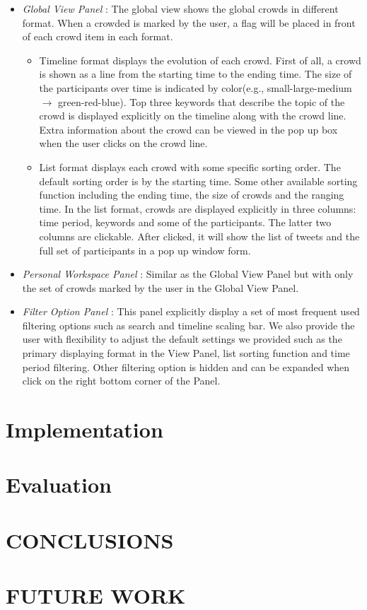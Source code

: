 \documentclass{sig-alternate}
\begin{document}
\begin{itemize}
	\item \textit{Global View Panel} : The global view shows the global crowds in different format. When a crowded is marked by the user, a flag will be placed in front of each crowd item in each format.
			
			\begin{itemize}
				\item Timeline format displays the evolution of each crowd. First of all, a crowd is shown as a line from the starting time to the ending time. The size of the participants over time is indicated by color(e.g., small-large-medium $\longrightarrow$ green-red-blue). Top three keywords that describe the topic of the crowd is displayed explicitly on the timeline along with the crowd line. Extra information about the crowd can be viewed in the pop up box when the user clicks on the crowd line.
				\item List format displays each crowd with some specific sorting order. The default sorting order is by the starting time. Some other available sorting function including the ending time, the size of crowds and the ranging time. In the list format, crowds are displayed explicitly in three columns: time period, keywords and some of the participants. The latter two columns are clickable. After clicked, it will show the list of tweets and the full set of participants in a pop up window form. 
		\end{itemize}			
	
	\item \textit{Personal Workspace Panel} : Similar as the Global View Panel but with only the set of crowds marked by the user in the Global View Panel.
	\item \textit{Filter Option Panel} : This panel explicitly display a set of most frequent used filtering options such as search and timeline scaling bar. We also provide the user with flexibility to adjust the default settings we provided such as the primary displaying format in the View Panel, list sorting function and time period filtering. Other filtering option is hidden and can be expanded when click on the right bottom corner of the Panel.
\end{itemize}

\section{Implementation}

\section{Evaluation}

\section{CONCLUSIONS}

\section{FUTURE WORK}


 
\end{document}
